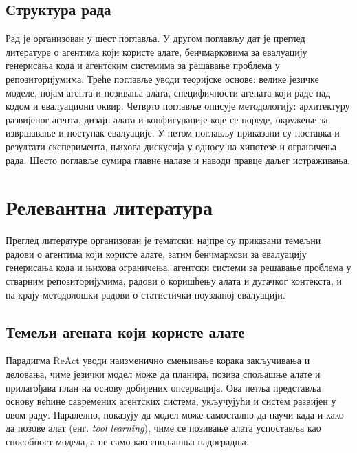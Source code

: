 \documentclass[12pt,a4paper]{report}
\begin{document}
	\section{Структура рада}

	Рад је организован у шест поглавља. У другом поглављу дат је преглед
	литературе о агентима који користе алате, бенчмарковима за евалуацију
	генерисања кода и агентским системима за решавање проблема у
	репозиторијумима. Треће поглавље уводи теоријске основе: велике језичке
	моделе, појам агента и позивања алата, специфичности агената који раде над
	кодом и евалуациони оквир. Четврто поглавље описује методологију:
	архитектуру развијеног агента, дизајн алата и конфигурације које се пореде,
	окружење за извршавање и поступак евалуације. У петом поглављу приказани су
	поставка и резултати експеримента, њихова дискусија у односу на хипотезе и
	ограничења рада. Шесто поглавље сумира главне налазе и наводи правце даљег
	истраживања.
	
	\chapter{Релевантна литература}
	

	Преглед литературе организован је тематски: најпре су приказани темељни
	радови о агентима који користе алате, затим бенчмаркови за евалуацију
	генерисања кода и њихова ограничења, агентски системи за решавање проблема
	у стварним репозиторијумима, радови о коришћењу алата и дугачког контекста,
	и на крају методолошки радови о статистички поузданој евалуацији.

	\section{Темељи агената који користе алате}

	Парадигма ReAct \parencite{yao2023react} уводи наизменично смењивање корака
	закључивања и деловања, чиме језички модел може да планира, позива спољашње
	алате и прилагођава план на основу добијених опсервација. Ова петља
	представља основу већине савремених агентских система, укључујући и систем
	развијен у овом раду. Паралелно, \textcite{schick2023toolformer} показују да
	модел може самостално да научи када и како да позове алат (енг.
	\textit{tool learning}), чиме се позивање алата успоставља као способност
	модела, а не само као спољашња надоградња.
\end{document}
